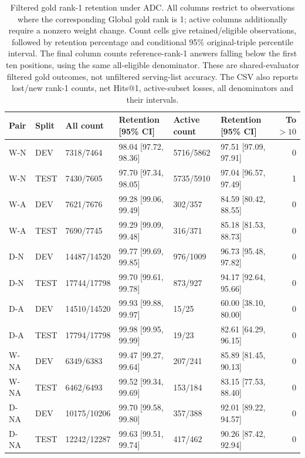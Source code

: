 \begin{table}[htbp]
\centering\footnotesize\setlength{\tabcolsep}{3pt}
\caption{Filtered gold rank-1 retention under ADC. All columns restrict to observations where the corresponding Global gold rank is 1; active columns additionally require a nonzero weight change. Count cells give retained/eligible observations, followed by retention percentage and conditional 95\% original-triple percentile interval. The final column counts reference-rank-1 answers falling below the first ten positions, using the same all-eligible denominator. These are shared-evaluator filtered gold outcomes, not unfiltered serving-list accuracy. The CSV also reports lost/new rank-1 counts, net Hits@1, active-subset losses, all denominators and their intervals.}
\label{tab:outcome-top1}
\begin{tabular}{lll lllr}
\toprule
Pair & Split & All count & Retention [95\% CI] & Active count & Retention [95\% CI] & To $>10$\\
\midrule
W-N & DEV & 7318/7464 & 98.04 [97.72, 98.36] & 5716/5862 & 97.51 [97.09, 97.91] & 0\\
W-N & TEST & 7430/7605 & 97.70 [97.34, 98.05] & 5735/5910 & 97.04 [96.57, 97.49] & 1\\
W-A & DEV & 7621/7676 & 99.28 [99.06, 99.49] & 302/357 & 84.59 [80.42, 88.55] & 0\\
W-A & TEST & 7690/7745 & 99.29 [99.09, 99.48] & 316/371 & 85.18 [81.53, 88.73] & 0\\
D-N & DEV & 14487/14520 & 99.77 [99.69, 99.85] & 976/1009 & 96.73 [95.48, 97.82] & 0\\
D-N & TEST & 17744/17798 & 99.70 [99.61, 99.78] & 873/927 & 94.17 [92.64, 95.66] & 0\\
D-A & DEV & 14510/14520 & 99.93 [99.88, 99.97] & 15/25 & 60.00 [38.10, 80.00] & 0\\
D-A & TEST & 17794/17798 & 99.98 [99.95, 99.99] & 19/23 & 82.61 [64.29, 96.15] & 0\\
W-NA & DEV & 6349/6383 & 99.47 [99.27, 99.64] & 207/241 & 85.89 [81.45, 90.13] & 0\\
W-NA & TEST & 6462/6493 & 99.52 [99.34, 99.69] & 153/184 & 83.15 [77.53, 88.40] & 0\\
D-NA & DEV & 10175/10206 & 99.70 [99.58, 99.80] & 357/388 & 92.01 [89.22, 94.57] & 0\\
D-NA & TEST & 12242/12287 & 99.63 [99.51, 99.74] & 417/462 & 90.26 [87.42, 92.94] & 0\\
\bottomrule
\end{tabular}
\end{table}
